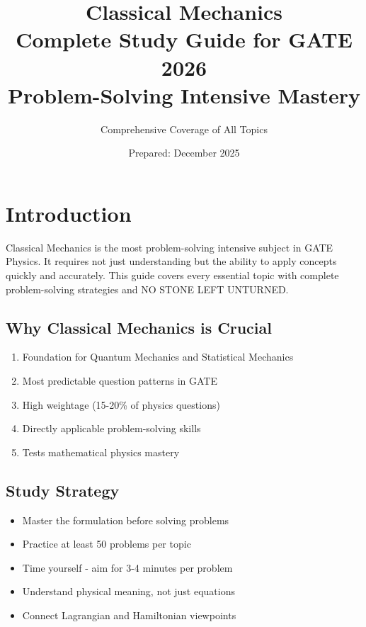 \documentclass[12pt,a4paper]{article}
\title{\Huge\textbf{Classical Mechanics}\\[0.3cm]
\Large Complete Study Guide for GATE 2026\\[0.2cm]
\large Problem-Solving Intensive Mastery}
\author{Comprehensive Coverage of All Topics}
\date{Prepared: December 2025}
\theoremstyle{definition}
\begin{document}
\maketitle
\newpage

\tableofcontents
\newpage

\section{Introduction}

\begin{importantbox}
Classical Mechanics is the most problem-solving intensive subject in GATE Physics. It requires not just understanding but the ability to apply concepts quickly and accurately. This guide covers every essential topic with complete problem-solving strategies and NO STONE LEFT UNTURNED.
\end{importantbox}

\subsection{Why Classical Mechanics is Crucial}
\begin{enumerate}
    \item Foundation for Quantum Mechanics and Statistical Mechanics
    \item Most predictable question patterns in GATE
    \item High weightage (15-20\% of physics questions)
    \item Directly applicable problem-solving skills
    \item Tests mathematical physics mastery
\end{enumerate}

\subsection{Study Strategy}
\begin{tipbox}
\begin{itemize}
    \item Master the formulation before solving problems
    \item Practice at least 50 problems per topic
    \item Time yourself - aim for 3-4 minutes per problem
    \item Understand physical meaning, not just equations
    \item Connect Lagrangian and Hamiltonian viewpoints
\end{itemize}
\end{tipbox}
\end{document}
